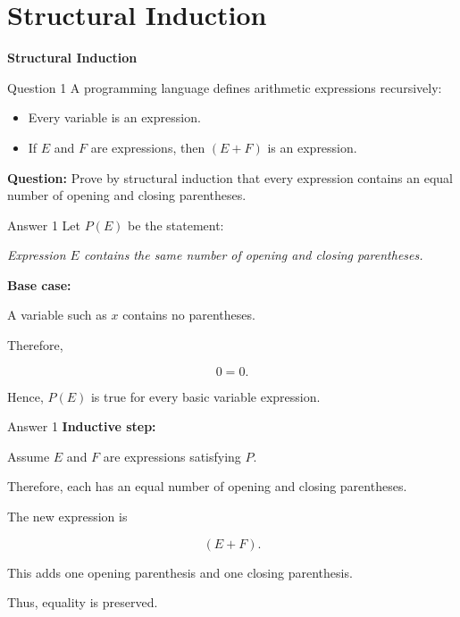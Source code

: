 \section{Structural Induction}

\begin{frame}
\centering
\Huge\textbf{Structural Induction}
\end{frame}


\begin{frame}{Question 1}
A programming language defines arithmetic expressions recursively:

\begin{itemize}
\item Every variable is an expression.
\item If $E$ and $F$ are expressions, then $(E+F)$ is an expression.
\end{itemize}

\textbf{Question:} Prove by structural induction that every expression contains an equal number of opening and closing parentheses.
\end{frame}

\begin{frame}{Answer 1}
Let $P(E)$ be the statement:

\textit{Expression $E$ contains the same number of opening and closing parentheses.}

\textbf{Base case:}

A variable such as $x$ contains no parentheses.

Therefore,

$$
0=0.
$$

Hence, $P(E)$ is true for every basic variable expression.
\end{frame}

\begin{frame}{Answer 1}
\textbf{Inductive step:}

Assume $E$ and $F$ are expressions satisfying $P$.

Therefore, each has an equal number of opening and closing parentheses.

The new expression is

$$
(E+F).
$$

This adds one opening parenthesis and one closing parenthesis.

Thus, equality is preserved.
\end{frame}


